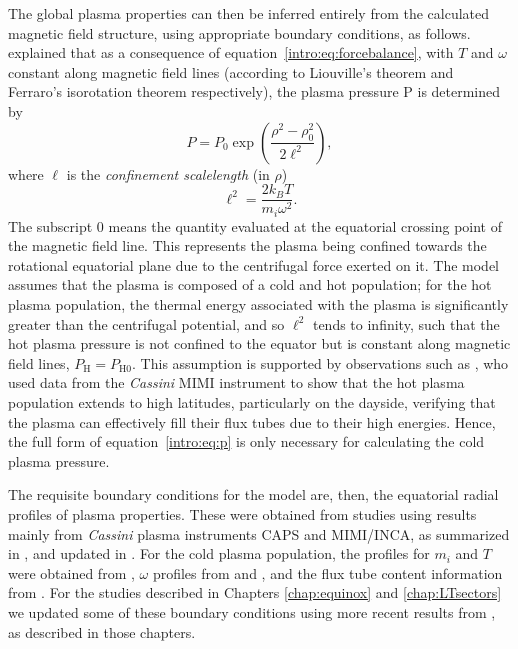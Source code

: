 The global plasma properties can then be inferred entirely from the calculated magnetic field structure, using appropriate boundary conditions, as follows. \citet{caudal1986} explained that as a consequence of equation~\ref{intro:eq:forcebalance}, with $T$ and $\omega$ constant along magnetic field lines (according to Liouville's theorem and Ferraro's isorotation theorem respectively), the plasma pressure P is determined by 
\begin{equation}\label{intro:eq:p}
P = P_{0}\exp\left(\frac{\rho^2-\rho_0^2}{2\ell^2}\right),
\end{equation}
where $\ell$ is the \textit{confinement scalelength} (in $\rho$)
\begin{equation}
\ell^2 = \frac{2k_BT}{m_i\omega^2}.
\end{equation}
The subscript 0 means the quantity evaluated at the equatorial crossing point of the magnetic field line. This represents the plasma being confined towards the rotational equatorial plane due to the centrifugal force exerted on it. The model assumes that the plasma is composed of a cold and hot population; for the hot plasma population, the thermal energy associated with the plasma is significantly greater than the centrifugal potential, and so $\ell^2$ tends to infinity, such that the hot plasma pressure is not confined to the equator but is constant along magnetic field lines, $P_\mathrm{H} = P_\mathrm{H0}$. This assumption is supported by observations such as \citet{krimigis2007}, who used data from the \textit{Cassini} MIMI instrument to show that the hot plasma population extends to high latitudes, particularly on the dayside, verifying that the plasma can effectively fill their flux tubes due to their high energies.  Hence, the full form of equation~\ref{intro:eq:p} is only necessary for calculating the cold plasma pressure.

The requisite boundary conditions for the model are, then, the equatorial radial profiles of plasma properties. These were obtained from studies using results mainly from \textit{Cassini} plasma instruments CAPS and MIMI/INCA, as summarized in \citet{achilleos2010a}, and updated in \citet{achilleos2010b}. For the cold plasma population, the profiles for $m_i$ and $T$ were obtained from \citet{wilson2008}, $\omega$ profiles from \citet{wilson2008} and \citet{kane2008}, and the flux tube content information from \citet{mcandrews2009}. For the studies described in Chapters \ref{chap:equinox} and \ref{chap:LTsectors} we updated some of these boundary conditions using more recent results from \citet{wilson2017}, as described in those chapters.

